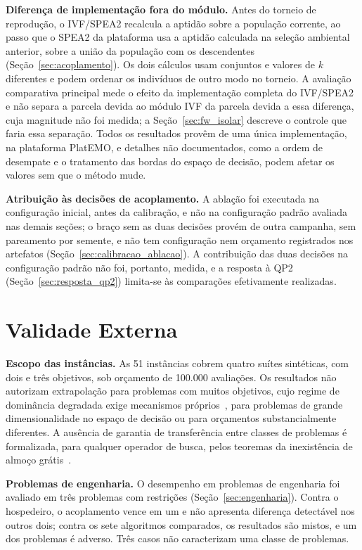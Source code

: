 \textbf{Diferença de implementação fora do módulo.} Antes do torneio de reprodução, o IVF/SPEA2 recalcula a aptidão sobre a população corrente, ao passo que o SPEA2 da plataforma usa a aptidão calculada na seleção ambiental anterior, sobre a união da população com os descendentes (Seção~\ref{sec:acoplamento}). Os dois cálculos usam conjuntos e valores de $k$ diferentes e podem ordenar os indivíduos de outro modo no torneio. A avaliação comparativa principal mede o efeito da implementação completa do IVF/SPEA2 e não separa a parcela devida ao módulo IVF da parcela devida a essa diferença, cuja magnitude não foi medida; a Seção~\ref{sec:fw_isolar} descreve o controle que faria essa separação. Todos os resultados provêm de uma única implementação, na plataforma PlatEMO, e detalhes não documentados, como a ordem de desempate e o tratamento das bordas do espaço de decisão, podem afetar os valores sem que o método mude.

\textbf{Atribuição às decisões de acoplamento.} A ablação foi executada na configuração inicial, antes da calibração, e não na configuração padrão avaliada nas demais seções; o braço sem as duas decisões provém de outra campanha, sem pareamento por semente, e não tem configuração nem orçamento registrados nos artefatos (Seção~\ref{sec:calibracao_ablacao}). A contribuição das duas decisões na configuração padrão não foi, portanto, medida, e a resposta à QP2 (Seção~\ref{sec:resposta_qp2}) limita-se às comparações efetivamente realizadas.

\section{Validade Externa}

\textbf{Escopo das instâncias.} As 51 instâncias cobrem quatro suítes sintéticas, com dois e três objetivos, sob orçamento de 100.000 avaliações. Os resultados não autorizam extrapolação para problemas com muitos objetivos, cujo regime de dominância degradada exige mecanismos próprios~\cite{li2015many}, para problemas de grande dimensionalidade no espaço de decisão ou para orçamentos substancialmente diferentes. A ausência de garantia de transferência entre classes de problemas é formalizada, para qualquer operador de busca, pelos teoremas da inexistência de almoço grátis~\cite{wolpert1997no}.

\textbf{Problemas de engenharia.} O desempenho em problemas de engenharia foi avaliado em três problemas com restrições (Seção~\ref{sec:engenharia}). Contra o hospedeiro, o acoplamento vence em um e não apresenta diferença detectável nos outros dois; contra os sete algoritmos comparados, os resultados são mistos, e um dos problemas é adverso. Três casos não caracterizam uma classe de problemas.

